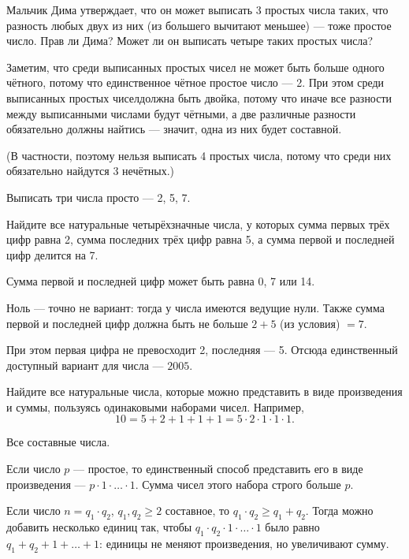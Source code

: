 

\begin{itemize}

	\itA Мальчик Дима утверждает, что он может выписать 3 простых числа таких, что разность любых двух из них (из большего вычитают меньшее) — тоже простое число. Прав ли Дима? Может ли он выписать четыре таких простых числа?
	
	\itr Заметим, что среди выписанных простых чисел не может быть больше одного чётного, потому что единственное чётное простое число — 2. При этом среди выписанных простых чисел\linebreak должна быть двойка, потому что иначе все разности между выписанными числами будут чётными, а две различные разности обязательно должны найтись — значит, одна из них будет составной.
	
	(В частности, поэтому нельзя выписать 4 простых числа, потому что среди них обязательно найдутся 3 нечётных.)
	
	Выписать три числа просто — 2, 5, 7.

	\itB Найдите все натуральные четырёхзначные числа, у которых сумма первых трёх цифр равна 2, сумма последних трёх цифр равна 5, а сумма первой и последней цифр делится на 7.
	
	\itr Сумма первой и последней цифр может быть равна 0, 7 или 14.
	
	Ноль — точно не вариант: тогда у числа имеются ведущие нули. Также сумма первой и последней цифр должна быть не больше $2+5$ (из условия) $=7$.
	
	При этом первая цифра не превосходит 2, последняя — 5. Отсюда единственный доступный вариант для числа — $2005$.
	
	\itC Найдите все натуральные числа, которые можно представить в виде произведения и суммы, пользуясь одинаковыми наборами чисел. Например,
	$$10 = 5+2+1+1+1 = 5 \cdot 2 \cdot 1 \cdot 1 \cdot 1.$$
	
	\itr Все составные числа.
	
	Если число $p$ — простое, то единственный способ представить его в виде произведения — $p \cdot 1 \cdot \ldots \cdot 1$. Сумма чисел этого набора строго больше $p$.
	
	Если число $n = q_1 \cdot q_2$, $q_1, q_2 \ge 2$ составное, то $q_1 \cdot q_2 \ge q_1 + q_2$. Тогда можно добавить несколько единиц так, чтобы $q_1 \cdot q_2 \cdot 1 \cdot \ldots \cdot 1$ было равно $q_1 + q_2 + 1 + \ldots + 1$: единицы не меняют произведения, но увеличивают сумму.

\end{itemize}

